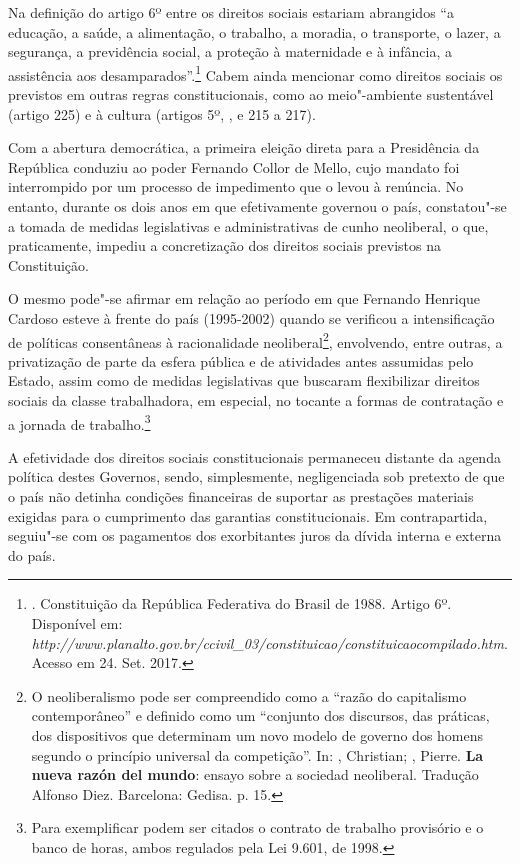 Na definição do artigo 6º entre os direitos sociais estariam abrangidos
``a educação, a saúde, a alimentação, o trabalho, a moradia, o
transporte, o lazer, a segurança, a previdência social, a proteção à
maternidade e à infância, a assistência aos desamparados''.\footnote{.
  Constituição da República Federativa do Brasil de 1988. Artigo 6º.
  Disponível em: \emph{http://www.planalto.gov.br/ccivil\_03/constituicao/constituicaocompilado.htm}.
  Acesso em 24. Set. 2017.} Cabem ainda mencionar como direitos sociais
os previstos em outras regras constitucionais, como ao meio"-ambiente
sustentável (artigo 225) e à cultura (artigos 5º, , e 215 a 217).

Com a abertura democrática, a primeira eleição direta para a Presidência
da República conduziu ao poder Fernando Collor de Mello, cujo mandato
foi interrompido por um processo de impedimento que o levou à renúncia.
No entanto, durante os dois anos em que efetivamente governou o país,
constatou"-se a tomada de medidas legislativas e administrativas de cunho
neoliberal, o que, praticamente, impediu a concretização dos direitos
sociais previstos na Constituição.

O mesmo pode"-se afirmar em relação ao período em que Fernando Henrique
Cardoso esteve à frente do país (1995-2002) quando se verificou a
intensificação de políticas consentâneas à racionalidade
neoliberal\footnote{O neoliberalismo pode ser compreendido como a
  ``razão do capitalismo contemporâneo'' e definido como um ``conjunto
  dos discursos, das práticas, dos dispositivos que determinam um novo
  modelo de governo dos homens segundo o princípio universal da
  competição''. In: , Christian; , Pierre. \textbf{La nueva
  razón del mundo}: ensayo sobre a sociedad neoliberal. Tradução Alfonso
  Diez. Barcelona: Gedisa. p. 15.}, envolvendo, entre outras, a
privatização de parte da esfera pública e de atividades antes assumidas
pelo Estado, assim como de medidas legislativas que buscaram
flexibilizar direitos sociais da classe trabalhadora, em especial, no
tocante a formas de contratação e a jornada de trabalho.\footnote{Para
  exemplificar podem ser citados o contrato de trabalho provisório e o
  banco de horas, ambos regulados pela Lei 9.601, de 1998.}

A efetividade dos direitos sociais constitucionais permaneceu distante
da agenda política destes Governos, sendo, simplesmente, negligenciada
sob pretexto de que o país não detinha condições financeiras de suportar
as prestações materiais exigidas para o cumprimento das garantias
constitucionais. Em contrapartida, seguiu"-se com os pagamentos dos
exorbitantes juros da dívida interna e externa do país.

